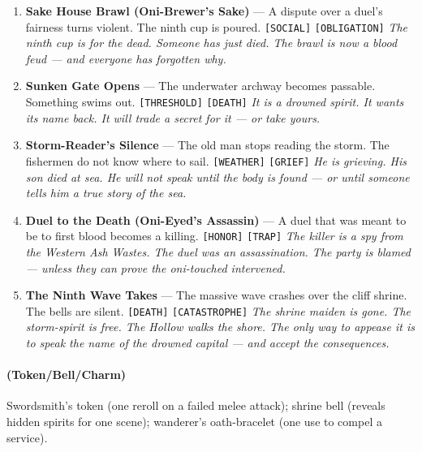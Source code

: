 \begin{enumerate}
  \hfill \textit{The fishing fleet cannot be recalled. Someone must warn them --- or bargain with the storm-spirit for their lives.}
\item \textbf{Sake House Brawl (Oni-Brewer's Sake)} --- A dispute over a duel's fairness turns violent. The ninth cup is poured. \texttt{[SOCIAL]} \texttt{[OBLIGATION]}
  \hfill \textit{The ninth cup is for the dead. Someone has just died. The brawl is now a blood feud --- and everyone has forgotten why.}
\item[J] \textbf{Sunken Gate Opens} --- The underwater archway becomes passable. Something swims out. \texttt{[THRESHOLD]} \texttt{[DEATH]}
  \hfill \textit{It is a drowned spirit. It wants its name back. It will trade a secret for it --- or take yours.}
\item[Q] \textbf{Storm-Reader's Silence} --- The old man stops reading the storm. The fishermen do not know where to sail. \texttt{[WEATHER]} \texttt{[GRIEF]}
  \hfill \textit{He is grieving. His son died at sea. He will not speak until the body is found --- or until someone tells him a true story of the sea.}
\item[K] \textbf{Duel to the Death (Oni-Eyed's Assassin)} --- A duel that was meant to be to first blood becomes a killing. \texttt{[HONOR]} \texttt{[TRAP]}
  \hfill \textit{The killer is a spy from the Western Ash Wastes. The duel was an assassination. The party is blamed --- unless they can prove the oni-touched intervened.}
\item[A] \textbf{The Ninth Wave Takes} --- The massive wave crashes over the cliff shrine. The bells are silent. \texttt{[DEATH]} \texttt{[CATASTROPHE]}
  \hfill \textit{The shrine maiden is gone. The storm-spirit is free. The Hollow walks the shore. The only way to appease it is to speak the name of the drowned capital --- and accept the consequences.}
\end{enumerate}

\paragraph*{(Token/Bell/Charm)} Swordsmith's token (one reroll on a failed melee attack); shrine bell (reveals hidden spirits for one scene); wanderer's oath-bracelet (one use to compel a service).

